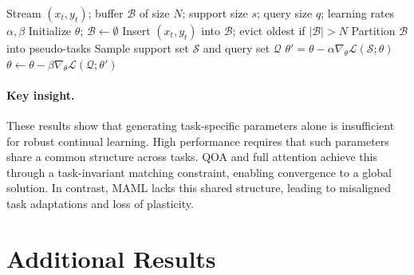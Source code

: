\documentclass{article}
\begin{document}
\begin{algorithm}[t]
\caption{MAML with Replay Buffer}
\label{alg:maml_replay}
\begin{algorithmic}[1]
\Require Stream $(x_t,y_t)$; buffer $\mathcal{B}$ of size $N$; support size $s$; query size $q$; learning rates $\alpha,\beta$
\State Initialize $\theta$; $\mathcal{B} \gets \emptyset$
    \State Insert $(x_t,y_t)$ into $\mathcal{B}$; evict oldest if $|\mathcal{B}|>N$
    \State Partition $\mathcal{B}$ into pseudo-tasks
        \State Sample support set $\mathcal{S}$ and query set $\mathcal{Q}$
        \State $\theta' = \theta - \alpha \nabla_\theta \mathcal{L}(\mathcal{S}; \theta)$
        \State $\theta \leftarrow \theta - \beta \nabla_\theta \mathcal{L}(\mathcal{Q}; \theta')$
    \EndFor
\EndFor
\end{algorithmic}
\end{algorithm}


\paragraph{Key insight.}
These results show that generating task-specific parameters alone is insufficient for robust continual learning. High performance requires that such parameters share a common structure across tasks. QOA and full attention achieve this through a task-invariant matching constraint, enabling convergence to a global solution. In contrast, MAML lacks this shared structure, leading to misaligned task adaptations and loss of plasticity.

\section{Additional Results}
\label{sec:additional_results}
\end{document}
